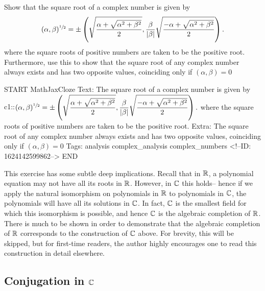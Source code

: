 \documentclass{memoir}
\begin{document}
\begin{hw}
	Show that the square root of a complex number is given by
	\begin{align*}
		(\alpha ,\beta )^{\sfrac{1}{2}} = \pm \left( \sqrt{ \frac{\alpha + \sqrt{\alpha^2+\beta^2} }{2}} , \frac{\beta }{\left| \beta  \right| } \sqrt{ \frac{-\alpha + \sqrt{\alpha^2+\beta^2} }{2}} \right) .
	\end{align*}
	where the square roots of positive numbers are taken to be the positive root. Furthermore, use this to show that the square root of any complex number always exists and has two opposite values, coinciding only if \((\alpha ,\beta )=0 \)
\end{hw}

\begin{anki}
START
MathJaxCloze
Text: The square root of a complex number is given by
 {{c1::\(\begin{align*}
         	(\alpha ,\beta )^{\sfrac{1}{2}} = \pm \left( \sqrt{ \frac{\alpha + \sqrt{\alpha^2+\beta^2} }{2}} , \frac{\beta }{\left| \beta  \right| } \sqrt{ \frac{-\alpha + \sqrt{\alpha^2+\beta^2} }{2}} \right) .
         \end{align*}\)}}
where the square roots of positive numbers are taken to be the positive root. 
Extra: The square root of any complex number always exists and has two opposite values, coinciding only if \((\alpha ,\beta )=0 \)
Tags: analysis complex_analysis complex_numbers
<!--ID: 1624142599862-->
END
\end{anki}

This exercise has some subtle deep implications. Recall that in \(\mathbb{R}\), a polynomial equation may not have all its roots in \(\mathbb{R}\). However, in \(\mathbb{C}\) this holds-- hence if we apply the natural isomorphism on polynomials in \(\mathbb{R}\) to polynomials in \(\mathbb{C}\), the polynomials will have all its solutions in \(\mathbb{C}\). In fact, \(\mathbb{C}\) is the smallest field for which this isomorphism is possible, and hence \(\mathbb{C}\) is the algebraic completion of \(\mathbb{R}\).\\

There is much to be shown in order to demonstrate that the algebraic completion of \(\mathbb{R}\) corresponds to the construction of \(\mathbb{C}\) above. For brevity, this will be skipped, but for first-time readers, the author highly encourages one to read this construction in detail elsewhere.

\subsection{Conjugation in \(\mathbb{C}\)}
\label{sub:conjugation_in_c}
\end{document}

